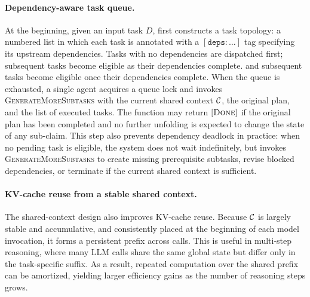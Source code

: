 \paragraph{Dependency-aware task queue.} At the beginning, given an input task $D$, \toolName{} first constructs a task topology: a numbered list in which each task is annotated with a $[\texttt{deps}: \ldots]$ tag specifying its upstream dependencies. Tasks with no dependencies are dispatched first; subsequent tasks become eligible as their dependencies complete. and subsequent tasks become eligible once their dependencies complete.
When the queue is exhausted, a single agent acquires a queue lock and invokes \textsc{GenerateMoreSubtasks} with the current shared context $\mathcal{C}$, the original plan, and the list of executed tasks. The function may return $[\textsc{Done}]$ if the original plan has been completed and no further unfolding is expected to change the state of any sub-claim. This step also prevents dependency deadlock in practice: when no pending task is eligible, the system does not wait indefinitely, but invokes \textsc{GenerateMoreSubtasks} to create missing prerequisite subtasks, revise blocked dependencies, or terminate if the current shared context is sufficient.

\paragraph{KV-cache reuse from a stable shared context.}
The shared-context design also improves KV-cache reuse. Because $\mathcal{C}$ is largely stable and accumulative, and consistently placed at the
beginning of each model invocation, it forms a persistent prefix across calls. This is useful in multi-step reasoning, where many LLM calls share the same global state but differ only in the task-specific suffix. As a result, repeated computation over the shared prefix can be amortized, yielding larger efficiency gains as the number of reasoning steps grows.


